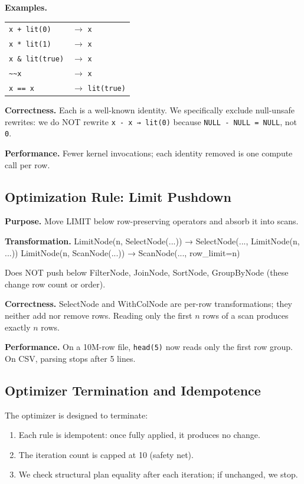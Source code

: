 \documentclass[11pt]{article}
\let\oldverbatim=\verbatim
\let\oldendverbatim=\endverbatim
\renewenvironment{verbatim}{\vspace{-6pt}\oldverbatim}{\oldendverbatim\vspace{-4pt}}
\begin{document}
\textbf{Examples.}

{\small\begin{tabular}{ll}
  \texttt{x + lit(0)} & $\to$ \texttt{x} \\
  \texttt{x * lit(1)} & $\to$ \texttt{x} \\
  \texttt{x \& lit(true)} & $\to$ \texttt{x} \\
  \texttt{\textasciitilde{}\textasciitilde{}x} & $\to$ \texttt{x} \\
  \texttt{x == x} & $\to$ \texttt{lit(true)} \\
\end{tabular}}

\textbf{Correctness.} Each is a well-known identity. We specifically exclude 
null-unsafe rewrites: we do NOT rewrite \texttt{x - x → lit(0)} because 
\texttt{NULL - NULL = NULL}, not \texttt{0}.

\textbf{Performance.} Fewer kernel invocations; each identity removed is one 
compute call per row.

\subsection{Optimization Rule: Limit Pushdown}

\textbf{Purpose.} Move LIMIT below row-preserving operators and absorb it into 
scans.

\textbf{Transformation.}
\begin{verbatim}
LimitNode(n, SelectNode(...))  →  SelectNode(..., LimitNode(n, ...))
LimitNode(n, ScanNode(...))    →  ScanNode(..., row_limit=n)
\end{verbatim}

Does NOT push below FilterNode, JoinNode, SortNode, GroupByNode (these change 
row count or order).

\textbf{Correctness.} SelectNode and WithColNode are per-row transformations; 
they neither add nor remove rows. Reading only the first \(n\) rows of a scan 
produces exactly \(n\) rows.

\textbf{Performance.} On a 10M-row file, \texttt{head(5)} now reads only the 
first row group. On CSV, parsing stops after 5 lines.

\subsection{Optimizer Termination and Idempotence}

The optimizer is designed to terminate:
\begin{enumerate}
  \item Each rule is idempotent: once fully applied, it produces no change.
  \item The iteration count is capped at 10 (safety net).
  \item We check structural plan equality after each iteration; if unchanged, 
    we stop.
\end{enumerate}
\end{document}
